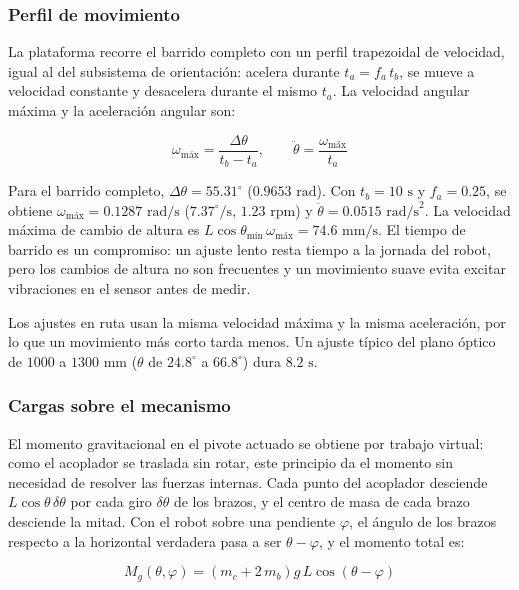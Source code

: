 \documentclass[../../General.tex]{subfiles}
\begin{document}
\subsubsection{Perfil de movimiento}

La plataforma recorre el barrido completo con un perfil trapezoidal de velocidad, igual al del subsistema de orientación: acelera durante $t_a = f_a\,t_b$, se mueve a velocidad constante y desacelera durante el mismo $t_a$. La velocidad angular máxima y la aceleración angular son:

\begin{equation}\label{eq:perfil_elev}
    \omega_{\text{máx}} = \frac{\Delta\theta}{t_b - t_a}, \qquad \ddot{\theta} = \frac{\omega_{\text{máx}}}{t_a}
\end{equation}

Para el barrido completo, $\Delta\theta = 55.31^\circ$ ($0.9653\text{ rad}$). Con $t_b = 10\text{ s}$ y $f_a = 0.25$, se obtiene $\omega_{\text{máx}} = 0.1287\text{ rad/s}$ ($7.37^\circ/\text{s}$, $1.23\text{ rpm}$) y $\ddot{\theta} = 0.0515\text{ rad/s}^2$. La velocidad máxima de cambio de altura es $L\cos\theta_{\text{mín}}\,\omega_{\text{máx}} = 74.6\text{ mm/s}$. El tiempo de barrido es un compromiso: un ajuste lento resta tiempo a la jornada del robot, pero los cambios de altura no son frecuentes y un movimiento suave evita excitar vibraciones en el sensor antes de medir.

Los ajustes en ruta usan la misma velocidad máxima y la misma aceleración, por lo que un movimiento más corto tarda menos. Un ajuste típico del plano óptico de $1000$ a $1300\text{ mm}$ ($\theta$ de $24.8^\circ$ a $66.8^\circ$) dura $8.2\text{ s}$.

\subsubsection{Cargas sobre el mecanismo}

El momento gravitacional en el pivote actuado se obtiene por trabajo virtual: como el acoplador se traslada sin rotar, este principio da el momento sin necesidad de resolver las fuerzas internas. Cada punto del acoplador desciende $L\cos\theta\,\delta\theta$ por cada giro $\delta\theta$ de los brazos, y el centro de masa de cada brazo desciende la mitad. Con el robot sobre una pendiente $\varphi$, el ángulo de los brazos respecto a la horizontal verdadera pasa a ser $\theta - \varphi$, y el momento total es:

\begin{equation}\label{eq:Mg_elev}
    M_g(\theta, \varphi) = \left(m_c + 2\,m_b\right) g\, L \cos(\theta - \varphi)
\end{equation}
\end{document}
